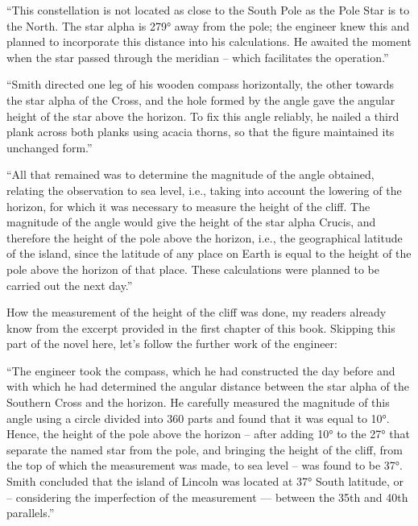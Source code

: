 ``This constellation is not located as close to the South Pole as the Pole Star is to the North. The star alpha is \ang{279} away from the pole; the engineer knew this and planned to incorporate this distance into his calculations. He awaited the moment when the star passed through the meridian -- which facilitates the operation.''

``Smith directed one leg of his wooden compass horizontally, the other towards the star alpha of the Cross, and the hole formed by the angle gave the angular height of the star above the horizon. To fix this angle reliably, he nailed a third plank across both planks using acacia thorns, so that the figure maintained its unchanged form.''

``All that remained was to determine the magnitude of the angle obtained, relating the observation to sea level, i.e., taking into account the lowering of the horizon, for which it was necessary to measure the height of the cliff. The magnitude of the angle would give the height of the star alpha Crucis, and therefore the height of the pole above the horizon, i.e., the geographical latitude of the island, since the latitude of any place on Earth is equal to the height of the pole above the horizon of that place. These calculations were planned to be carried out the next day.''

How the measurement of the height of the cliff was done, my readers already know from the excerpt provided in the first chapter of this book. Skipping this part of the novel here, let's follow the further work of the engineer:

``The engineer took the compass, which he had constructed the day before and with which he had determined the angular distance between the star alpha of the Southern Cross and the horizon. He carefully measured the magnitude of this angle using a circle divided into 360 parts and found that it was equal to \ang{10}. Hence, the height of the pole above the horizon -- after adding \ang{10} to the \ang{27} that separate the named star from the pole, and bringing the height of the cliff, from the top of which the measurement was made, to sea level -- was found to be \ang{37}. Smith concluded that the island of Lincoln was located at \ang{37} South latitude, or -- considering the imperfection of the measurement — between the 35th and 40th parallels.''


